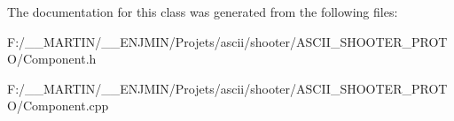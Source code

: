 The documentation for this class was generated from the following files\+:\begin{DoxyCompactItemize}
\item 
F\+:/\+\_\+\+\_\+\+M\+A\+R\+T\+I\+N/\+\_\+\+\_\+\+E\+N\+J\+M\+I\+N/\+Projets/ascii/shooter/\+A\+S\+C\+I\+I\+\_\+\+S\+H\+O\+O\+T\+E\+R\+\_\+\+P\+R\+O\+T\+O/Component.\+h\item 
F\+:/\+\_\+\+\_\+\+M\+A\+R\+T\+I\+N/\+\_\+\+\_\+\+E\+N\+J\+M\+I\+N/\+Projets/ascii/shooter/\+A\+S\+C\+I\+I\+\_\+\+S\+H\+O\+O\+T\+E\+R\+\_\+\+P\+R\+O\+T\+O/Component.\+cpp\end{DoxyCompactItemize}
